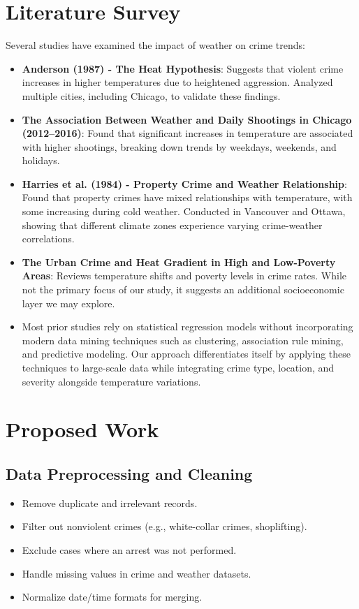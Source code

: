 \documentclass[sigconf,twocolumn,11pt]{acmart}
\begin{document}
\section{Literature Survey}
Several studies have examined the impact of weather on crime trends:
\begin{itemize}
    \item \textbf{Anderson (1987) - The Heat Hypothesis}: Suggests that violent crime increases in higher temperatures due to heightened aggression. Analyzed multiple cities, including Chicago, to validate these findings.
    \item \textbf{The Association Between Weather and Daily Shootings in Chicago (2012--2016)}: Found that significant increases in temperature are associated with higher shootings, breaking down trends by weekdays, weekends, and holidays.
    \item \textbf{Harries et al. (1984) - Property Crime and Weather Relationship}: Found that property crimes have mixed relationships with temperature, with some increasing during cold weather. Conducted in Vancouver and Ottawa, showing that different climate zones experience varying crime-weather correlations.
    \item \textbf{The Urban Crime and Heat Gradient in High and Low-Poverty Areas}: Reviews temperature shifts and poverty levels in crime rates. While not the primary focus of our study, it suggests an additional socioeconomic layer we may explore.
    \item Most prior studies rely on statistical regression models without incorporating modern data mining techniques such as clustering, association rule mining, and predictive modeling. Our approach differentiates itself by applying these techniques to large-scale data while integrating crime type, location, and severity alongside temperature variations.
\end{itemize}

\section{Proposed Work}
\subsection{Data Preprocessing and Cleaning}
\begin{itemize}
    \item Remove duplicate and irrelevant records.
    \item Filter out nonviolent crimes (e.g., white-collar crimes, shoplifting).
    \item Exclude cases where an arrest was not performed.
    \item Handle missing values in crime and weather datasets.
    \item Normalize date/time formats for merging.
\end{itemize}
\end{document}
